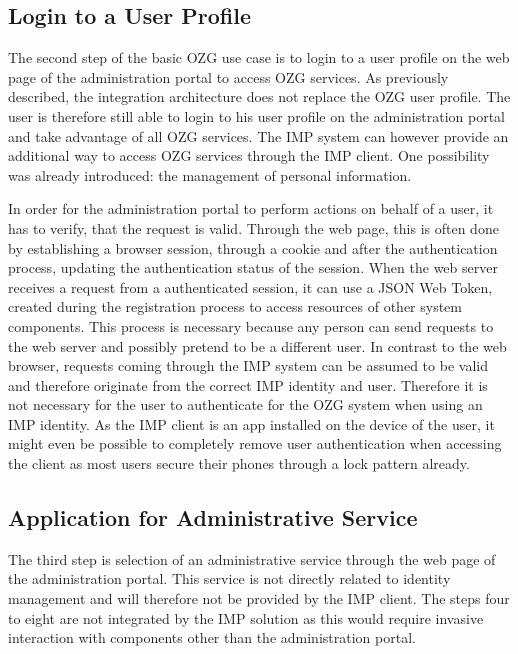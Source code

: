 \subsection{Login to a User Profile}

The second step of the basic OZG use case is to login to a user profile on the web page of the administration portal to access OZG services. As previously described, the integration architecture does not replace the OZG user profile. The user is therefore still able to login to his user profile on the administration portal and take advantage of all OZG services. The IMP system can however provide an additional way to access OZG services through the IMP client. One possibility was already introduced: the management of personal information.

In order for the administration portal to perform actions on behalf of a user, it has to verify, that the request is valid. Through the web page, this is often done by establishing a browser session, through a cookie and after the authentication process, updating the authentication status of the session. When the web server receives a request from a authenticated session, it can use a JSON Web Token, created during the registration process to access resources of other system components. This process is necessary because any person can send requests to the web server and possibly pretend to be a different user. In contrast to the web browser, requests coming through the IMP system can be assumed to be valid and therefore originate from the correct IMP identity and user. Therefore it is not necessary for the user to authenticate for the OZG system when using an IMP identity. As the IMP client is an app installed on the device of the user, it might even be possible to completely remove user authentication when accessing the client as most users secure their phones through a lock pattern already.

\subsection{Application for Administrative Service}
The third step is selection of an administrative service through the web page of the administration portal. This service is not directly related to identity management and will therefore not be provided by the IMP client.
The steps four to eight are not integrated by the IMP solution as this would require invasive interaction with components other than the administration portal.

